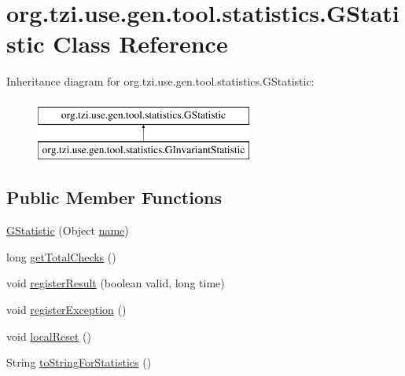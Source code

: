 \hypertarget{classorg_1_1tzi_1_1use_1_1gen_1_1tool_1_1statistics_1_1_g_statistic}{\section{org.\-tzi.\-use.\-gen.\-tool.\-statistics.\-G\-Statistic Class Reference}
\label{classorg_1_1tzi_1_1use_1_1gen_1_1tool_1_1statistics_1_1_g_statistic}
}
Inheritance diagram for org.\-tzi.\-use.\-gen.\-tool.\-statistics.\-G\-Statistic\-:\begin{figure}[H]
\begin{center}
\leavevmode
\includegraphics[height=2.000000cm]{classorg_1_1tzi_1_1use_1_1gen_1_1tool_1_1statistics_1_1_g_statistic}
\end{center}
\end{figure}
\subsection*{Public Member Functions}
\begin{DoxyCompactItemize}
\item 
\hyperlink{classorg_1_1tzi_1_1use_1_1gen_1_1tool_1_1statistics_1_1_g_statistic_a4067b7f168945446406f11da061e1359}{G\-Statistic} (Object \hyperlink{classorg_1_1tzi_1_1use_1_1gen_1_1tool_1_1statistics_1_1_g_statistic_a39c74856cd7b4e4dae3366c182ff808e}{name})
\item 
long \hyperlink{classorg_1_1tzi_1_1use_1_1gen_1_1tool_1_1statistics_1_1_g_statistic_a58a31bd5f263926fca46ae65404cde26}{get\-Total\-Checks} ()
\item 
void \hyperlink{classorg_1_1tzi_1_1use_1_1gen_1_1tool_1_1statistics_1_1_g_statistic_a29c709499dae9120c52324f1b0207a9f}{register\-Result} (boolean valid, long time)
\item 
void \hyperlink{classorg_1_1tzi_1_1use_1_1gen_1_1tool_1_1statistics_1_1_g_statistic_aa5dd4d1dd36bbbeaf49652c632a6e3f0}{register\-Exception} ()
\item 
void \hyperlink{classorg_1_1tzi_1_1use_1_1gen_1_1tool_1_1statistics_1_1_g_statistic_a107afa3e00cec98fb41069fac5d5d9c1}{local\-Reset} ()
\item 
String \hyperlink{classorg_1_1tzi_1_1use_1_1gen_1_1tool_1_1statistics_1_1_g_statistic_a9c8fd6eed1cec480300c0b7748b3e48e}{to\-String\-For\-Statistics} ()
\end{DoxyCompactItemize}

